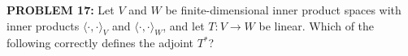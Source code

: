 \documentclass[12pt]{amsart}
\newcommand{\divider}{
  \vspace{-1em} %
  \noindent
  \raisebox{-0.15ex}{\textbullet}%
  \hspace{0.5em}%
  \rule[0.5ex]{0.95\textwidth}{1.0pt}%
  \hspace{0.5em}%
  \raisebox{-0.15ex}{\textbullet}%
  \vspace{0em} %
}
\begin{document}


{\bf PROBLEM 17:}
%
Let $V$ and $W$ be finite-dimensional inner product spaces with inner products $\langle \cdot, \cdot \rangle_V$ and $\langle \cdot, \cdot \rangle_W$, and let $T: V \to W$ be linear. Which of the following correctly defines the adjoint $T^*$?
\end{document}
